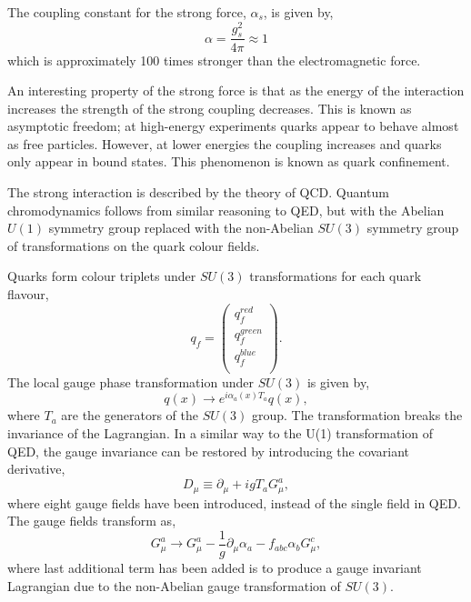 The coupling constant for the strong force, $\alpha_s$, is given by,
\begin{equation}
\alpha = \frac{g_s^2}{4 \pi} \approx 1
\end{equation}
which is approximately 100 times stronger than the {electromagnetic} force.

An interesting property of the strong force is that as the energy of the interaction
increases the strength of the strong coupling decreases. This is known as
asymptotic freedom; at high-energy experiments quarks appear to behave almost as
free particles. However, at lower energies the coupling increases and quarks
only appear in bound states. This phenomenon is known as quark confinement. 

The strong interaction is described by the theory of {QCD}.
Quantum chromodynamics follows from similar reasoning to {QED}, but with
the Abelian $U(1)$ symmetry group replaced with the non-Abelian $SU(3)$ symmetry
group of transformations on the quark colour fields.

Quarks form colour triplets under $SU(3)$ transformations for each quark
flavour,
\begin{equation}
q_{f} =
\left(\begin{matrix} 
q^{red}_{f} \\
q^{green}_{f} \\
q^{blue}_{f} \\
\end{matrix} \right).
\end{equation}
The local gauge phase transformation under $SU(3)$ is given by,
\begin{equation}
q(x) \to e^{i\alpha_a(x)T_a} q(x),
\end{equation}
where $T_a$ are the generators of the $SU(3)$ group. The transformation breaks
the invariance of the Lagrangian. In a similar way to the U(1) transformation of
QED, the gauge invariance can be restored by introducing the covariant
derivative,
\begin{equation}
D_{\mu} \equiv \partial_{\mu} + i g T_{a} G_{\mu}^{a},
\end{equation}
where eight gauge fields have been introduced, instead of the single field in
QED.  The gauge fields transform as,
\begin{equation}
 G_{\mu}^{a} \to G_{\mu}^{a} 
-\frac{1}{g}\partial_{\mu}\alpha_{a}
-f_{abc}\alpha_{b}G^{c}_{\mu},
\end{equation}
where last additional term has been added is to produce a gauge invariant
Lagrangian due to the non-Abelian gauge transformation of $SU(3)$.

